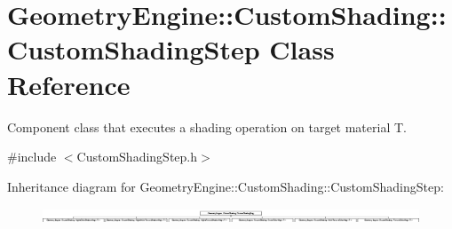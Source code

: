 \hypertarget{class_geometry_engine_1_1_custom_shading_1_1_custom_shading_step}{}\section{Geometry\+Engine\+::Custom\+Shading\+::Custom\+Shading\+Step Class Reference}
\label{class_geometry_engine_1_1_custom_shading_1_1_custom_shading_step}


Component class that executes a shading operation on target material T.  




{\ttfamily \#include $<$Custom\+Shading\+Step.\+h$>$}

Inheritance diagram for Geometry\+Engine\+::Custom\+Shading\+::Custom\+Shading\+Step\+:\begin{figure}[H]
\begin{center}
\leavevmode
\includegraphics[height=0.449799cm]{class_geometry_engine_1_1_custom_shading_1_1_custom_shading_step}
\end{center}
\end{figure}

